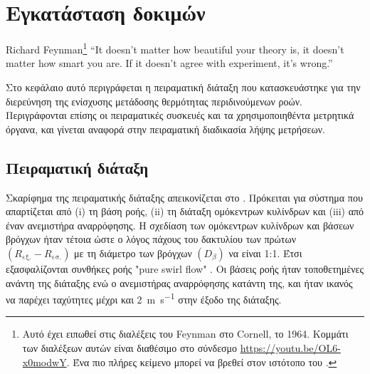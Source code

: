 \chapter{Εγκατάσταση δοκιμών}\label{ch:experiment}

\begin{chapquote}{Richard Feynman\footnote{Αυτό έχει ειπωθεί στις διαλέξεις του Feynman στο Cornell, το 1964. Κομμάτι των διαλέξεων αυτών είναι διαθέσιμο στο σύνδεσμο \href{https://youtu.be/OL6-x0modwY}{https://youtu.be/OL6-x0modwY}. Ένα πιο πλήρες κείμενο μπορεί να βρεθεί στον ιστότοπο του \citeauthor{Pomeroy2012} \cite{Pomeroy2012}.}}
“It doesn’t matter how beautiful your theory is, it doesn’t matter how smart you are.
If it doesn’t agree with experiment, it’s wrong.”
\end{chapquote}

\ifpdf
    \graphicspath{{Chapter3/Figs/Raster/}{Chapter3/Figs/PDF/}{Chapter3/Figs/}}
\else
    \graphicspath{{Chapter3/Figs/Vector/}{Chapter3/Figs/}}
\fi




\noindent Στο κεφάλαιο αυτό περιγράφεται η πειραματική διάταξη που κατασκευάστηκε για την διερεύνηση της ενίσχυσης μετάδοσης θερμότητας περιδινούμενων ροών. Περιγράφονται επίσης οι πειραματικές συσκευές και τα χρησιμοποιηθέντα μετρητικά όργανα, και γίνεται αναφορά στην πειραματική διαδικασία λήψης μετρήσεων.

\section{Πειραματική διάταξη}

\noindent Σκαρίφημα της πειραματικής διάταξης απεικονίζεται στο . Πρόκειται για σύστημα που απαρτίζεται από (i) τη βάση ροής, (ii) τη διάταξη ομόκεντρων κυλίνδρων και (iii) από έναν ανεμιστήρα αναρρόφησης. Η σχεδίαση των ομόκεντρων κυλίνδρων και βάσεων βρόγχων ήταν τέτοια ώστε ο λόγος πάχους του δακτυλίου των πρώτων $\left(R_{\text{εξ.}} - R_{\text{εσ.}}\right)$ με τη διάμετρο των βρόγχων $\left(D_{\beta}\right)$ να είναι 1:1. Έτσι εξασφαλίζονται συνθήκες ροής "pure swirl flow" \cite{1991_Legentilhomme}. Οι βάσεις ροής ήταν τοποθετημένες ανάντη της διάταξης ενώ ο ανεμιστήρας αναρρόφησης κατάντη της, και ήταν ικανός να παρέχει ταχύτητες μέχρι και \qty{2}{\metre\per\second} στην έξοδο της διάταξης. 

